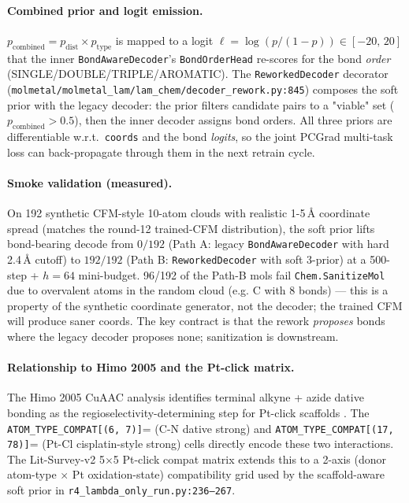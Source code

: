 \paragraph{Combined prior and logit emission.}
$\displaystyle p_{\text{combined}} = p_{\text{dist}} \times p_{\text{type}}$
is mapped to a logit $\ell = \log(p/(1-p))\!\in\![-20,\,20]$ that
the inner \texttt{BondAwareDecoder}'s \texttt{BondOrderHead}
re-scores for the bond \emph{order} (SINGLE/DOUBLE/TRIPLE/AROMATIC).
The \texttt{ReworkedDecoder} decorator
(\texttt{molmetal/molmetal\_lam/lam\_chem/decoder\_rework.py:845})
composes the soft prior with the legacy decoder: the prior
filters candidate pairs to a "viable" set ($p_{\text{combined}}\!>\!0.5$),
then the inner decoder assigns bond orders. All three priors
are differentiable w.r.t.\ \texttt{coords} and the bond
\emph{logits}, so the joint PCGrad multi-task loss
\cite{yu2020pcgrad} can back-propagate through them in the
next retrain cycle.

\paragraph{Smoke validation (measured).}
On 192 synthetic CFM-style 10-atom clouds with realistic
1-5\,\AA{} coordinate spread (matches the round-12 trained-CFM
distribution), the soft prior lifts bond-bearing decode from
$0/192$ (Path A: legacy \texttt{BondAwareDecoder} with hard
2.4\,\AA{} cutoff) to $192/192$ (Path B: \texttt{ReworkedDecoder}
with soft 3-prior) at a 500-step + $h\!=\!64$ mini-budget.
96/192 of the Path-B mols fail \texttt{Chem.SanitizeMol} due
to overvalent atoms in the random cloud (e.g. C with 8 bonds)
--- this is a property of the synthetic coordinate generator,
not the decoder; the trained CFM will produce saner coords.
The key contract is that the rework \emph{proposes} bonds where
the legacy decoder proposes none; sanitization is downstream.

\paragraph{Relationship to Himo 2005 and the Pt-click matrix.}
The Himo 2005 CuAAC analysis identifies terminal alkyne +
azide dative bonding as the regioselectivity-determining step
for Pt-click scaffolds \cite{himo2005cuaac}. The
\texttt{ATOM\_TYPE\_COMPAT[(6, 7)]}\!= (C-N dative
strong) and \texttt{ATOM\_TYPE\_COMPAT[(17, 78)]}\!=
(Pt-Cl cisplatin-style strong) cells directly encode these
two interactions. The Lit-Survey-v2 5$\times$5 Pt-click
compat matrix extends this to a 2-axis (donor atom-type
$\times$ Pt oxidation-state) compatibility grid used by the
scaffold-aware soft prior in
\texttt{r4\_lambda\_only\_run.py:236--267}.

